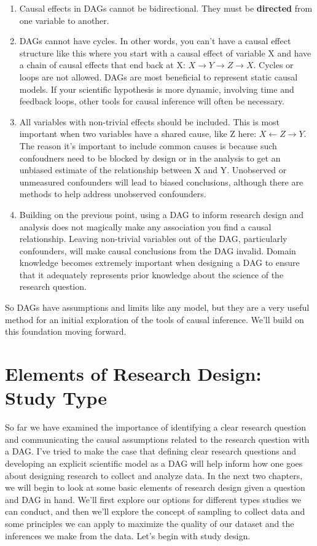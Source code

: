 \documentclass[
]{book}
\begin{document}
\begin{enumerate}
\def\labelenumi{\arabic{enumi}.}
\item
  Causal effects in DAGs cannot be bidirectional. They must be \textbf{directed} from one variable to another.
\item
  DAGs cannot have cycles. In other words, you can't have a causal effect structure like this where you start with a causal effect of variable X and have a chain of causal effects that end back at X: \(X \to Y \to Z \to X\). Cycles or loops are not allowed. DAGs are most beneficial to represent static causal models. If your scientific hypothesis is more dynamic, involving time and feedback loops, other tools for causal inference will often be necessary.
\item
  All variables with non-trivial effects should be included. This is most important when two variables have a shared cause, like Z here: \(X \gets Z \to Y\). The reason it's important to include common causes is because such confoudners need to be blocked by design or in the analysis to get an unbiased estimate of the relationship between X and Y. Unobserved or unmeasured confounders will lead to biased conclusions, although there are methods to help address unobserved confounders.
\item
  Building on the previous point, using a DAG to inform research design and analysis does not magically make any association you find a causal relationship. Leaving non-trivial variables out of the DAG, particularly confounders, will make causal conclusions from the DAG invalid. Domain knowledge becomes extremely important when designing a DAG to ensure that it adequately represents prior knowledge about the science of the research question.
\end{enumerate}

So DAGs have assumptions and limits like any model, but they are a very useful method for an initial exploration of the tools of causal inference. We'll build on this foundation moving forward.

\chapter{Elements of Research Design: Study Type}\label{elements-of-research-design-study-type}

So far we have examined the importance of identifying a clear research question and communicating the causal assumptions related to the research question with a DAG. I've tried to make the case that defining clear research questions and developing an explicit scientific model as a DAG will help inform how one goes about designing research to collect and analyze data. In the next two chapters, we will begin to look at some basic elements of research design given a question and DAG in hand. We'll first explore our options for different types studies we can conduct, and then we'll explore the concept of sampling to collect data and some principles we can apply to maximize the quality of our dataset and the inferences we make from the data. Let's begin with study design.
\end{document}
